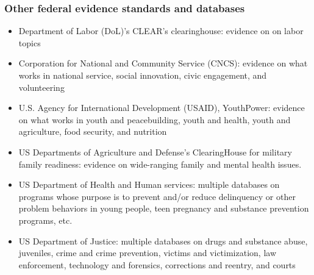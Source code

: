 \documentclass[usenames,dvipsnames]{beamer}
\begin{document}

\begin{frame}[label= other_agencies]
\frametitle{Other federal evidence standards and databases}
\scriptsize
\begin{itemize}
	\item Department of Labor (DoL)'s CLEAR's clearinghouse: evidence on on labor topics 
	\item Corporation for National and Community Service (CNCS): evidence on what works in national service, social innovation, civic engagement, and volunteering
	\item U.S. Agency for International Development (USAID), YouthPower:  evidence on what works in youth and peacebuilding, youth and health, youth and agriculture, food security, and nutrition
	\item US Departments of Agriculture and Defense's ClearingHouse for military family readiness: evidence on wide-ranging family and mental health issues. 
	\item US Department of Health and Human services: multiple databases on programs whose purpose is to prevent and/or reduce delinquency or other problem behaviors in young people, teen pregnancy and substance prevention programs, etc.
	\item US Department of Justice: multiple databases on drugs and substance abuse, juveniles, crime and crime prevention, victims and victimization, law enforcement, technology and forensics, corrections and reentry, and courts
\end{itemize}


\end{frame}







\end{document}
